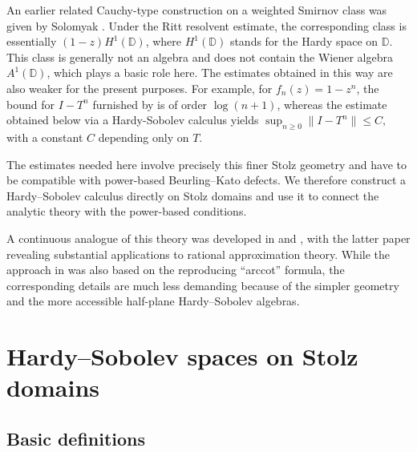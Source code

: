 \documentclass[11pt]{amsart}
\numberwithin{equation}{section}
\theoremstyle{definition}
\theoremstyle{plain}
\begin{document}
An earlier related Cauchy-type construction on a weighted Smirnov class
was given by Solomyak \cite[Propositions~1.1 and~1.3]{Solomyak}. Under the Ritt
resolvent estimate, the corresponding class is essentially
\((1-z)H^1(\mathbb D)\), where $H^1(\mathbb D)$ stands for the Hardy space on $\mathbb D$. This class is generally not an algebra and does
not contain the Wiener algebra \(A^1(\mathbb D)\), 
which plays a basic role here. The estimates obtained
in this way are also weaker for the present purposes. For example, for
\(f_n(z)=1-z^n\), the bound for $I-T^n$ furnished by \cite{Solomyak} is of order
\(\log(n+1)\), whereas the estimate obtained below via a Hardy-Sobolev calculus yields
\(\sup_{n \ge 0}\|I-T^n\|\le C,\) with a constant $C$ depending only on $T$.


The estimates needed here involve precisely this finer Stolz geometry and
have to be compatible with power-based Beurling--Kato defects. We
therefore construct a Hardy--Sobolev calculus directly on Stolz domains
and use it to connect the analytic theory with the power-based conditions.

A continuous analogue of this theory was developed in \cite{BGT-Jussieu} and \cite{BGT-LMS},
with the latter paper revealing substantial applications to rational approximation theory.
While the approach in \cite{BGT-Jussieu} was also based on the reproducing ``arccot'' formula,
the corresponding details are much less demanding because of the simpler geometry 
and the more accessible half-plane Hardy–Sobolev algebras.


\section{Hardy--Sobolev spaces on Stolz domains}\label{sec:HS-spaces}

\subsection{Basic definitions}
\end{document}
